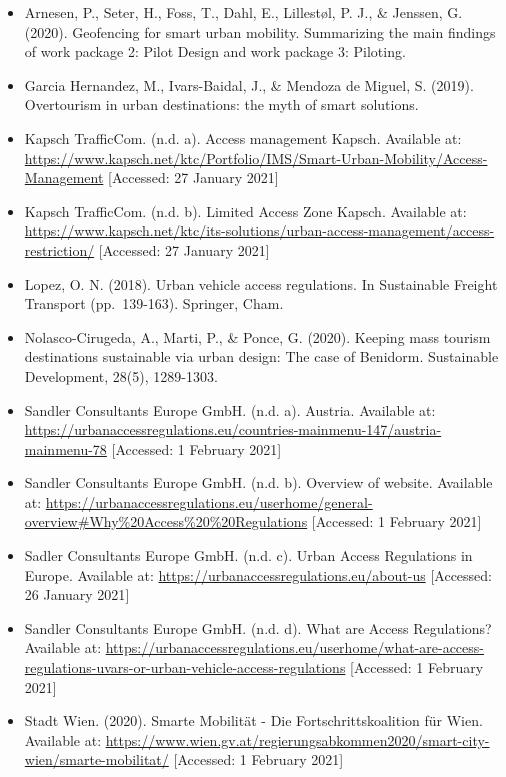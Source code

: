 \documentclass[
]{book}
\providecommand{\tightlist}{%
  \setlength{\itemsep}{0pt}\setlength{\parskip}{0pt}}
\begin{document}
\begin{itemize}
\tightlist
\item
  Arnesen, P., Seter, H., Foss, T., Dahl, E., Lillestøl, P. J., \& Jenssen, G. (2020). Geofencing for smart urban mobility. Summarizing the main findings of work package 2: Pilot Design and work package 3: Piloting.
\item
  Garcia Hernandez, M., Ivars-Baidal, J., \& Mendoza de Miguel, S. (2019). Overtourism in urban destinations: the myth of smart solutions.
\item
  Kapsch TrafficCom. (n.d. a). Access management \textbar{} Kapsch. Available at: \url{https://www.kapsch.net/ktc/Portfolio/IMS/Smart-Urban-Mobility/Access-Management} {[}Accessed: 27 January 2021{]}
\item
  Kapsch TrafficCom. (n.d. b). Limited Access Zone \textbar{} Kapsch. Available at: \url{https://www.kapsch.net/ktc/its-solutions/urban-access-management/access-restriction/} {[}Accessed: 27 January 2021{]}
\item
  Lopez, O. N. (2018). Urban vehicle access regulations. In Sustainable Freight Transport (pp.~139-163). Springer, Cham.
\item
  Nolasco-Cirugeda, A., Marti, P., \& Ponce, G. (2020). Keeping mass tourism destinations sustainable via urban design: The case of Benidorm. Sustainable Development, 28(5), 1289-1303.
\item
  Sandler Consultants Europe GmbH. (n.d. a). Austria. Available at: \url{https://urbanaccessregulations.eu/countries-mainmenu-147/austria-mainmenu-78} {[}Accessed: 1 February 2021{]}
\item
  Sandler Consultants Europe GmbH. (n.d. b). Overview of website. Available at: \url{https://urbanaccessregulations.eu/userhome/general-overview\#Why\%20Access\%20\%20Regulations} {[}Accessed: 1 February 2021{]}
\item
  Sadler Consultants Europe GmbH. (n.d. c). Urban Access Regulations in Europe. Available at: \url{https://urbanaccessregulations.eu/about-us} {[}Accessed: 26 January 2021{]}
\item
  Sandler Consultants Europe GmbH. (n.d. d). What are Access Regulations? Available at: \url{https://urbanaccessregulations.eu/userhome/what-are-access-regulations-uvars-or-urban-vehicle-access-regulations} {[}Accessed: 1 February 2021{]}
\item
  Stadt Wien. (2020). Smarte Mobilität - Die Fortschrittskoalition für Wien. Available at: \url{https://www.wien.gv.at/regierungsabkommen2020/smart-city-wien/smarte-mobilitat/} {[}Accessed: 1 February 2021{]}
\end{itemize}

  
\end{document}
